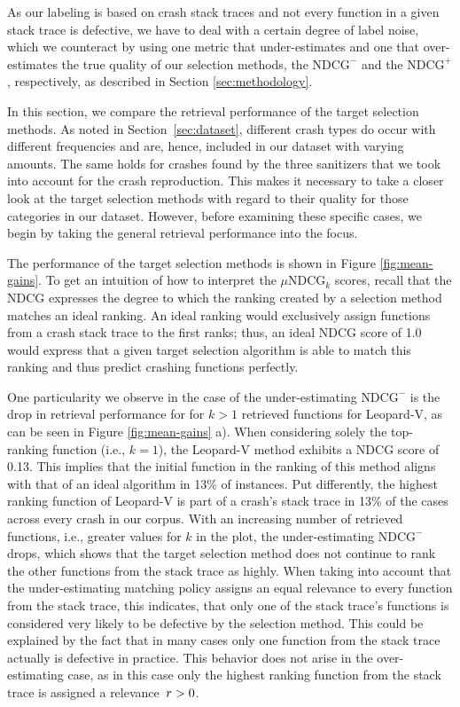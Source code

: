 As our labeling is based on crash stack traces and not every function in a given stack trace is defective, we have to deal with a certain degree of label noise, which we counteract by using one metric that under-estimates and one
that over-estimates the true quality of our selection methods, the $\text{NDCG}^-$ and the $\text{NDCG}^+$, respectively, as described in Section \ref{sec:methodology}.

In this section, we compare the retrieval performance of the target selection methods. As noted in Section~\ref{sec:dataset}, different crash types do occur with different frequencies and are, hence, included in our dataset with varying amounts. The same holds for crashes found by the three sanitizers that we took into account for the crash reproduction. This makes it necessary to take a closer look at the target selection methods with regard to their quality for those categories in our dataset.
However, before examining these specific cases, we begin by taking the general retrieval performance into the focus.


The performance of the target selection methods is shown in Figure
\ref{fig:mean-gains}. To get an intuition of how to interpret the $\mu\text{NDCG}_k$ scores, recall that the NDCG expresses the degree to which the ranking
created by a selection method matches an ideal ranking. An ideal ranking would exclusively assign functions from a crash stack trace to the first ranks; thus, an ideal NDCG score of 1.0 would
express that a given target selection algorithm is able to match this ranking and
thus predict crashing functions perfectly.

One particularity we observe in the case of the under-estimating $\text{NDCG}^-$ is the drop in retrieval performance for for $k > 1$ retrieved functions for Leopard-V, as can be seen in Figure \ref{fig:mean-gains} a).  When considering solely the top-ranking function (i.e.,\; $k=1$), the Leopard-V method exhibits a NDCG score of 0.13. This implies that the initial function in the ranking of this method aligns with that of an ideal algorithm in 13\% of instances. Put differently,
the highest ranking function of Leopard-V is part of a crash's stack trace in 13\%
of the cases across every crash in our corpus. With an increasing number of retrieved functions, i.e., greater values for $k$ in the plot, the under-estimating $\text{NDCG}^-$ drops, which
shows that the target selection method does not continue to rank the other
functions from the stack trace as highly. When taking into account that the
under-estimating matching policy assigns an equal relevance to every function from
the stack trace, this indicates, that only one of the stack trace's functions is
considered very likely to be defective by the selection method. This could be explained
by the fact that in many cases only one function from the stack trace actually is
defective in practice.
%
This behavior does not arise in the over-estimating case, as in this
case only the highest ranking function from the stack trace is assigned a relevance~$r > 0$.

